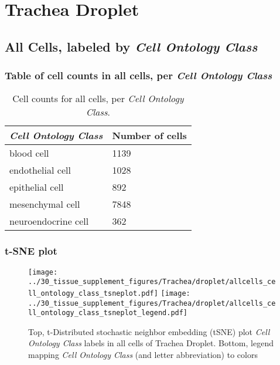\clearpage
\section{Trachea Droplet}

\subsection{All Cells, labeled by \emph{Cell Ontology Class}}
\subsubsection{Table of cell counts in all cells, per \emph{Cell Ontology Class}}\begin{table}[h]
\centering
\label{my-label}
\begin{tabular}{@{}ll@{}}
\toprule

\emph{Cell Ontology Class}& Number of cells \\ \midrule
blood cell & 1139 \\

endothelial cell & 1028 \\

epithelial cell & 892 \\

mesenchymal cell & 7848 \\

neuroendocrine cell & 362 \\
\bottomrule
\end{tabular}
\caption{Cell counts for all cells, per \emph{Cell Ontology Class}.}
\end{table}

\clearpage
\subsubsection{t-SNE plot}
\begin{figure}[h]
\centering
\texttt{[image: ../30\_tissue\_supplement\_figures/Trachea/droplet/allcells\_cell\_ontology\_class\_tsneplot.pdf]}
\texttt{[image: ../30\_tissue\_supplement\_figures/Trachea/droplet/allcells\_cell\_ontology\_class\_tsneplot\_legend.pdf]}
\caption{Top, t-Distributed stochastic neighbor embedding (tSNE) plot  \emph{Cell Ontology Class} labels in all cells of Trachea Droplet. Bottom, legend mapping \emph{Cell Ontology Class} (and letter abbreviation) to colors}
\end{figure}


\clearpage

